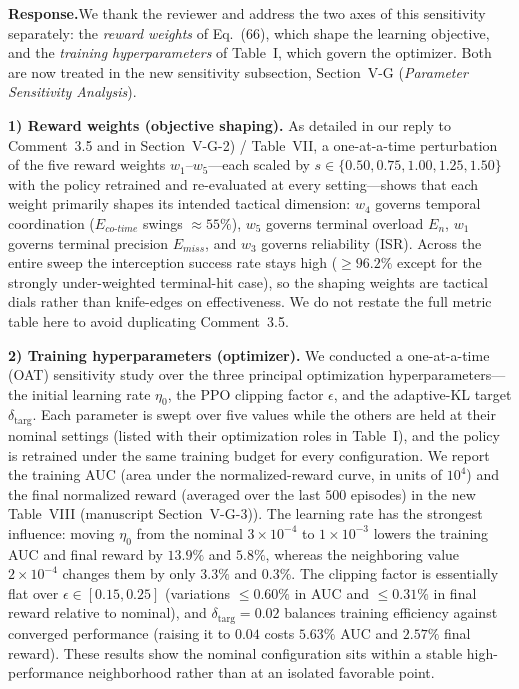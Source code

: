 \documentclass[11pt]{article}
\newcommand{\rsp}{\medskip\noindent\textbf{Response.}\quad}
\begin{document}
\rsp We thank the reviewer and address the two axes of this sensitivity separately: the
\emph{reward weights} of Eq.~(66), which shape the learning objective, and the
\emph{training hyperparameters} of Table~I, which govern the optimizer. Both are now
treated in the new sensitivity subsection, Section~V-G (\emph{Parameter Sensitivity
Analysis}).

\medskip\noindent\textbf{1) Reward weights (objective shaping).} As detailed in our reply
to Comment~3.5 and in Section~V-G-2) / Table~VII, a one-at-a-time perturbation of the five
reward weights $w_1$--$w_5$---each scaled by $s\in\{0.50,0.75,1.00,1.25,1.50\}$ with the
policy retrained and re-evaluated at every setting---shows that each weight primarily
shapes its intended tactical dimension: $w_4$ governs temporal coordination
($E_{co\text{-}time}$ swings $\approx55\%$), $w_5$ governs terminal overload $E_n$, $w_1$
governs terminal precision $E_{miss}$, and $w_3$ governs reliability (ISR). Across the
entire sweep the interception success rate stays high ($\geq96.2\%$ except for the
strongly under-weighted terminal-hit case), so the shaping weights are tactical dials
rather than knife-edges on effectiveness. We do not restate the full metric table here to
avoid duplicating Comment~3.5.

\medskip\noindent\textbf{2) Training hyperparameters (optimizer).} We conducted a
one-at-a-time (OAT) sensitivity study over the three principal optimization
hyperparameters---the initial learning rate $\eta_0$, the PPO clipping factor $\epsilon$,
and the adaptive-KL target $\delta_{\text{targ}}$. Each parameter is swept over five values
while the others are held at their nominal settings (listed with their optimization roles in
Table~I), and the policy is retrained under the same training budget for every
configuration. We report the training AUC (area under the normalized-reward curve, in units
of $10^4$) and the final normalized reward (averaged over the last $500$ episodes) in the
new Table~VIII (manuscript Section~V-G-3)). The learning rate has the strongest influence:
moving $\eta_0$ from the nominal $3\times10^{-4}$ to $1\times10^{-3}$ lowers the training AUC
and final reward by $13.9\%$ and $5.8\%$, whereas the neighboring value $2\times10^{-4}$
changes them by only $3.3\%$ and $0.3\%$. The clipping factor is essentially flat over
$\epsilon\in[0.15,0.25]$ (variations $\leq\!0.60\%$ in AUC and $\leq\!0.31\%$ in final reward
relative to nominal), and $\delta_{\text{targ}}=0.02$ balances training efficiency against
converged performance (raising it to $0.04$ costs $5.63\%$ AUC and $2.57\%$ final reward).
These results show the nominal configuration sits within a stable high-performance
neighborhood rather than at an isolated favorable point.
\end{document}
